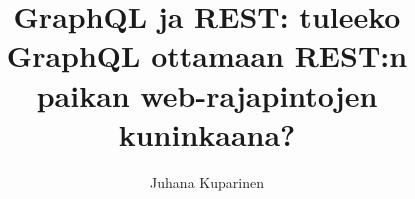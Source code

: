 \documentclass[a4paper,12pt,language=finnish,version=final,hidechapters=true,sharelatex=true,emptyfirstpages=true,minted=true]{utuftthesis}
\begin{document}




\title{GraphQL ja REST: tuleeko GraphQL ottamaan REST:n paikan web-rajapintojen kuninkaana?}
\author{Juhana Kuparinen}

\maketitle


\pagestyle{empty}

\tableofcontents



%
%
\begin{comment}
The thesis starts here.

To better organize things, create a new tex file for each chapter
and input it below.

Avoid using the å, ä, ö or <space> characters in referred names and
underscores \_ in file names (may break hyperref).

Good luck!
\end{comment}


%
%

\begin{comment}
The thesis main content ends here.
\end{comment}
\printbibliography

\begin{comment}
Create your appendix chapters with command \textbackslash appchapter\{some
name\} instead of \textbackslash chapter\{some name\} for the automagic
page counting to work!
\end{comment}


\begin{comment}
main document ends here
\end{comment}
\end{document}
